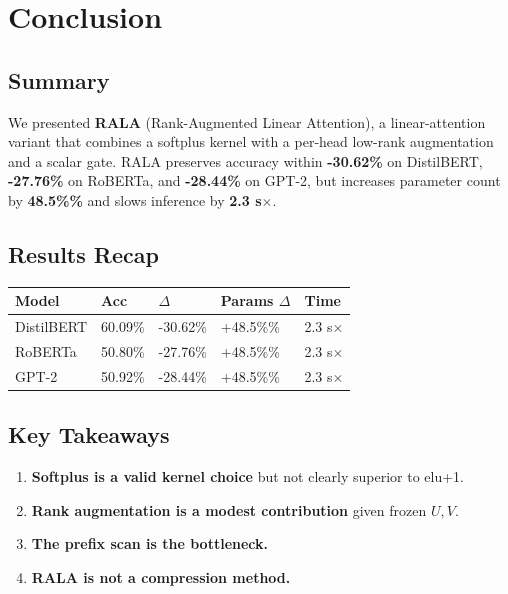 \section{Conclusion}

\subsection{Summary}

We presented \textbf{RALA} (Rank-Augmented Linear Attention), a linear-attention 
variant that combines a softplus kernel with a per-head low-rank augmentation 
and a scalar gate. RALA preserves accuracy within \textbf{-30.62\%} on 
DistilBERT, \textbf{-27.76\%} on RoBERTa, and \textbf{-28.44\%} on GPT-2, but 
increases parameter count by \textbf{48.5\%\%} and slows inference by 
\textbf{2.3 s$\times$}.

\subsection{Results Recap}

\begin{table}[H]
\centering
\small
\begin{tabular}{lllll}
\toprule
\textbf{Model} & \textbf{Acc} & \textbf{$\Delta$} & \textbf{Params $\Delta$} & \textbf{Time} \\
\midrule
DistilBERT & 60.09\% & -30.62\% & +48.5\%\% & 2.3 s$\times$ \\
RoBERTa & 50.80\% & -27.76\% & +48.5\%\% & 2.3 s$\times$ \\
GPT-2 & 50.92\% & -28.44\% & +48.5\%\% & 2.3 s$\times$ \\
\bottomrule
\end{tabular}
\end{table}

\subsection{Key Takeaways}

\begin{enumerate}
\item \textbf{Softplus is a valid kernel choice} but not clearly superior to elu+1.
\item \textbf{Rank augmentation is a modest contribution} given frozen $U, V$.
\item \textbf{The prefix scan is the bottleneck.}
\item \textbf{RALA is not a compression method.}

\end{enumerate}
